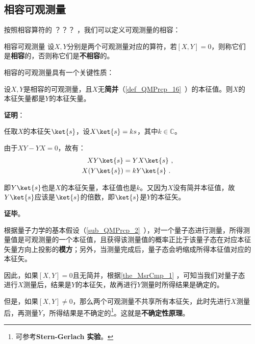 


\subsection{相容可观测量}



按照相容算符的 ？？？
，我们可以定义可观测量的相容：

\begin{definition}{相容可观测量}
设$X, Y$分别是两个可观测量对应的算符，若$[X, Y]=0$，则称它们是\textbf{相容}的，否则称它们是\textbf{不相容}的。
\end{definition}

相容的可观测量具有一个关键性质：

\begin{theorem}{}\label{the_MsrCmp_1}
设$X, Y$是相容的可观测量，且$X$无\textbf{简并}（\autoref{def_QMPrcp_16}~）的本征值。则$X$的本征矢量都是$Y$的本征矢量。
\end{theorem}

\textbf{证明}：

任取$X$的本征矢$\ket{s}$，设$X\ket{s}=ks$，其中$k\in\mathbb{C}$。

由于$XY-YX=0$，故有：
\begin{equation}
\begin{aligned}
XY\ket{s} &= YX\ket{s}~,\\
X(Y\ket{s}) &= kY\ket{s}~.
\end{aligned}
\end{equation}

即$Y\ket{s}$也是$X$的本征矢量，本征值也是$k$。又因为$X$没有简并本征值，故$Y\ket{s}$应该是$\ket{s}$的倍数，即$\ket{s}$是$Y$的本征矢。

\textbf{证毕}。


根据量子力学的基本假设（\autoref{sub_QMPrcp_2}~），对一个量子态进行测量，所得测量值是可观测量的一个本征值，且获得该测量值的概率正比于该量子态在对应本征矢量方向上投影的\textbf{模方}；另外，当测量完成后，量子态会坍缩成所得本征值对应的本征矢。

因此，如果$[X, Y]=0$且无简并，根据\autoref{the_MsrCmp_1} ，可知当我们对量子态进行$X$测量后，结果是$Y$的本征矢，故再进行$Y$测量时所得结果是确定的。

但是，如果$[X, Y]\neq 0$，那么两个可观测量不共享所有本征矢，此时先进行$X$测量后，再测量$Y$，所得结果是不确定的\footnote{可参考\textbf{Stern-Gerlach 实验}。}。这就是\textbf{不确定性原理}。



